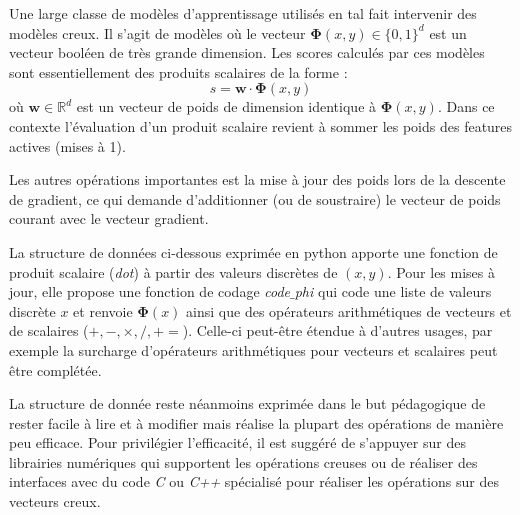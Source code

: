 \documentclass[11pt,openany]{book}
\newcommand{\ac}[1]{{\sc #1}} %
\begin{document}
Une large classe de modèles d'apprentissage utilisés en \ac{tal}
fait intervenir des modèles creux. Il s'agit de modèles où le vecteur 
$\boldsymbol\Phi(x,y) \in \{0,1\}^d$ est un vecteur booléen de très grande dimension.
Les scores calculés par ces modèles sont essentiellement des produits scalaires de la forme :
\begin{displaymath}
s = \mathbf{w}\cdot \boldsymbol\Phi(x,y)
\end{displaymath}
où $\mathbf{w} \in \mathbb{R}^d$ est un vecteur de poids de dimension identique à $\boldsymbol\Phi(x,y)$. Dans ce contexte l'évaluation d'un produit scalaire revient à sommer les poids des features actives (mises à 1). 

Les autres opérations importantes est la mise à jour des poids lors de la descente de gradient, ce qui demande d'additionner (ou de soustraire) le vecteur de poids courant avec le vecteur gradient.

La structure de données ci-dessous exprimée en python apporte une fonction de produit scalaire ({\sl dot}) à partir des valeurs discrètes de $(x,y)$. Pour les mises à jour, elle propose une fonction de codage {\sl code$\_$phi} qui code une liste de valeurs discrète $x$ et renvoie $\boldsymbol\Phi(x)$ ainsi que des opérateurs arithmétiques de vecteurs et de scalaires ($+,-,\times, / , +=$).
Celle-ci peut-être étendue à d'autres usages, par exemple la surcharge d'opérateurs arithmétiques pour vecteurs et scalaires peut être complétée.

La structure de donnée reste néanmoins exprimée dans le but pédagogique de rester facile à lire et à modifier mais réalise la plupart des opérations de manière peu efficace.  Pour privilégier l'efficacité, il est suggéré de s'appuyer sur des librairies numériques qui supportent les opérations creuses ou de réaliser des interfaces avec du code {\sl C} ou {\sl C++} spécialisé pour réaliser les opérations sur des vecteurs creux.
\end{document}
